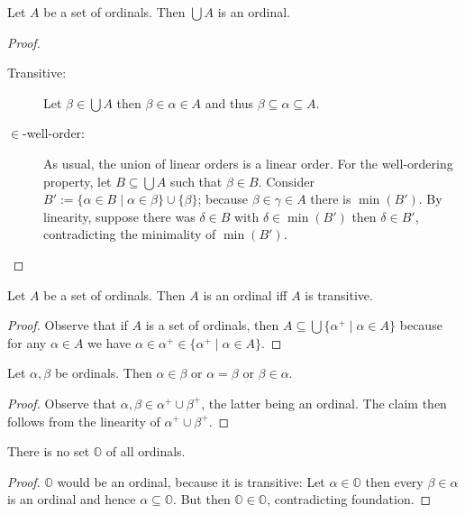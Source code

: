\documentclass{whrartcl}
\newcommand{\OO}{\mathbb{O}}
\begin{document}
\begin{lemma}
  Let $A$ be a set of ordinals. Then $\bigcup A$ is an ordinal.
\end{lemma}
\begin{proof}
  \
  \begin{description}
  \item[Transitive:] Let $\beta \in \bigcup A$ then $\beta \in \alpha \in A$ and
    thus $\beta \subseteq \alpha \subseteq A$.
\item[$\in$-well-order:] As usual, the union of linear orders is a linear order.
  For the well-ordering property, let $B \subseteq \bigcup A$ such that $\beta \in B$.
  Consider $B' := \{\alpha \in B \mid \alpha \in \beta\} \cup \{\beta\}$;
  because $\beta \in \gamma \in A$ there is $\min(B')$. By linearity, suppose
  there was $\delta \in B$ with $\delta \in \min(B')$ then $\delta \in B'$,
  contradicting the minimality of $\min(B')$.
  \end{description}
\end{proof}

\begin{corollary}
  Let $A$ be a set of ordinals. Then $A$ is an ordinal iff $A$ is transitive.
\end{corollary}
\begin{proof}
  Observe that if $A$ is a set of ordinals, then $A \subseteq \bigcup \{\alpha^+ \mid
  \alpha \in A\}$ because for any $\alpha \in A$ we have $\alpha \in \alpha^+
  \in \{\alpha^+ \mid \alpha \in A\}$.
\end{proof}

\begin{corollary}
  Let $\alpha, \beta$ be ordinals. Then $\alpha \in \beta$ or $\alpha = \beta$
  or $\beta \in \alpha$.
\end{corollary}
\begin{proof}
  Observe that $\alpha, \beta \in \alpha^+ \cup \beta^+$, the latter being an
  ordinal. The claim then follows from the linearity of $\alpha^+ \cup \beta^+$.
\end{proof}

\begin{corollary}
  There is no set $\OO$ of all ordinals.
\end{corollary}
\begin{proof}
  $\OO$ would be an ordinal, because it is transitive: Let $\alpha \in \OO$ then
  every $\beta \in \alpha$ is an ordinal and hence $\alpha \subseteq \OO$. But
  then $\OO \in \OO$, contradicting foundation.
\end{proof}
\end{document}
